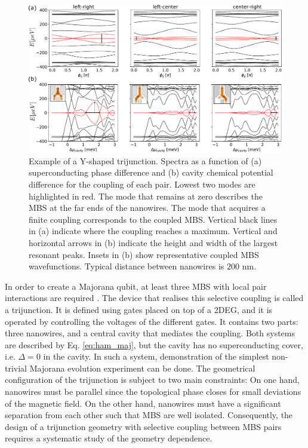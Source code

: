 \begin{figure}[h!!]
\centering
  \includegraphics[width=0.8\linewidth]{figures/trijunction_example.pdf}
  \caption{Example of a Y-shaped trijunction. Spectra as a function of (a) superconducting phase difference and (b) cavity chemical potential difference for the coupling of each pair. Lowest two modes are highlighted in red. The mode that remains at zero describes the MBS at the far ends of the nanowires. The mode that acquires a finite coupling corresponds to the coupled MBS. Vertical black lines in (a) indicate where the coupling reaches a maximum. Vertical and horizontal arrows in (b) indicate the height and width of the largest resonant peaks. Insets in (b) show representative coupled MBS wavefunctions. Typical distance between nanowires is $200$ nm.}
  \label{fig:tj_example}
\end{figure}

In order to create a Majorana qubit, at least three MBS with local pair interactions are required \cite{Alicea2011}.
The device that realises this selective coupling is called a trijunction.
It is defined using gates placed on top of a 2DEG, and it is operated by controlling the voltages of the different gates.
It contains two parts: three nanowires, and a central cavity that mediates the coupling.
Both systems are described by Eq. \eqref{eq:ham_maj}, but the cavity has no superconducting cover, i.e. $\Delta=0$ in the cavity.
In such a system, demonstration of the simplest non-trivial Majorana evolution experiment can be done.
The geometrical configuration of the trijunction is subject to two main constraints:
On one hand, nanowires must be parallel since the topological phase closes for small deviations of the magnetic field.
On the other hand, nanowires must have a significant separation from each other such that MBS are well isolated.
Consequently, the design of a trijunction geometry with selective coupling between MBS pairs requires a systematic study of the geometry dependence.

